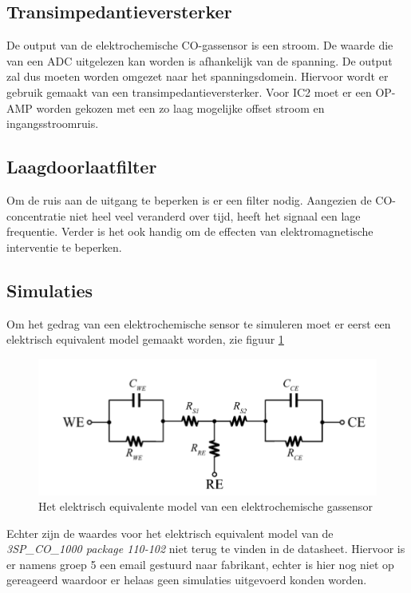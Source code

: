 \documentclass[a4paper, 11pt]{article} %
\begin{document}
	\subsection{Transimpedantieversterker} \label{subsec::transimpedantieversterker}
	De output van de elektrochemische CO-gassensor is een stroom. De waarde die van een ADC uitgelezen kan worden is afhankelijk van de spanning. De output zal dus moeten worden omgezet naar het spanningsdomein. Hiervoor wordt er gebruik gemaakt van een transimpedantieversterker.
	Voor IC2 moet er een OP-AMP worden gekozen met een zo laag mogelijke offset stroom en ingangsstroomruis.
	\subsection{Laagdoorlaatfilter} \label{subsec::laagdoorlaatfilter}
	Om de ruis aan de uitgang te beperken is er een filter nodig. Aangezien de CO-concentratie niet heel veel veranderd over tijd, heeft het signaal een lage frequentie. Verder is het ook handig om de effecten van elektromagnetische interventie te beperken.
	\newpage
	\subsection{Simulaties}
	Om het gedrag van een elektrochemische sensor te simuleren moet er eerst een elektrisch equivalent model gemaakt worden, zie figuur \ref{fig::EG_equivalent}
	\begin{figure}[h!]
		\centering
		\hspace*{-1cm} 
		\includegraphics[width=1.\linewidth]{../Media/electricalModel_EC_sensor.PNG}
		\caption{Het elektrisch equivalente model van een elektrochemische gassensor \cite{Mohammad Mahdi Ahmadi}}
		\label{fig::EG_equivalent}
	\end{figure}
	Echter zijn de waardes voor het elektrisch equivalent model van de \textit{3SP\_CO\_1000 package 110-102} niet terug te vinden in de datasheet. Hiervoor is er namens groep 5 een email gestuurd naar fabrikant, echter is hier nog niet op  gereageerd waardoor er helaas geen simulaties uitgevoerd konden worden.
	
\end{document}

